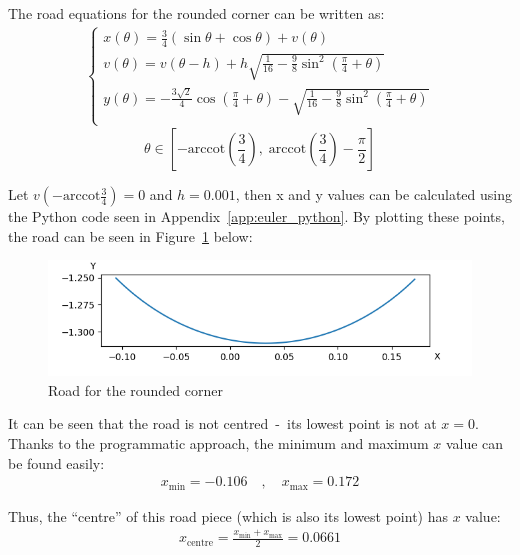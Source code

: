\documentclass[12pt]{article}
\begin{document}
        The road equations for the rounded corner can be written as:
        \begin{align}            
            \begin{cases}
            x(\theta) = \frac{3}{4} (\sin\theta + \cos\theta) + v(\theta) \\ %
            v(\theta) = v(\theta-h) + h \sqrt{\frac{1}{16} - \frac{9}{8} \sin^2 (\frac{\pi}{4}+\theta)} \\
            y(\theta) = - \frac{3\sqrt{2}}{4} \cos (\frac{\pi}{4} + \theta) - \sqrt{\frac{1}{16} - \frac{9}{8} \sin^2 (\frac{\pi}{4}+\theta)} \\
        \end{cases}
        \end{align}
        \[ \theta \in [- \text{arccot}(\frac{3}{4}), \;\text{arccot}(\frac{3}{4}) - \frac{\pi}{2}] \]

        Let $v(-\text{arccot}\frac{3}{4}) = 0$ and $h=0.001$, then x and y values can be calculated using the Python code seen in Appendix~\ref{app:euler_python}. By plotting these points, the road can be seen in Figure~\ref{fig:corner_road} below:
        \begin{figure}[H]
            \includegraphics[width=\linewidth]{images/corner_road.png}
            \caption{Road for the rounded corner}\label{fig:corner_road}
        \end{figure}

        It can be seen that the road is not centred~-~its lowest point is not at $x=0$. Thanks to the programmatic approach, the minimum and maximum $x$ value can be found easily:
        \begin{align*}
            x_{\text{min}} = -0.106 \quad , \quad x_{\text{max}} = 0.172
        \end{align*}

        Thus, the ``centre'' of this road piece (which is also its lowest point) has $x$ value:
        \begin{align}
            x_{\text{centre}} = \frac{x_{\text{min}}+x_{\text{max}}}{2} = 0.0661
        \end{align}
\end{document}
